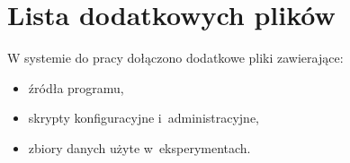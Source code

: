 \chapter{Lista dodatkowych plików}

W systemie do pracy dołączono dodatkowe pliki zawierające:
\begin{itemize}
    \item źródła programu,
    \item skrypty konfiguracyjne i~administracyjne,
    \item zbiory danych użyte w~eksperymentach.
\end{itemize}
